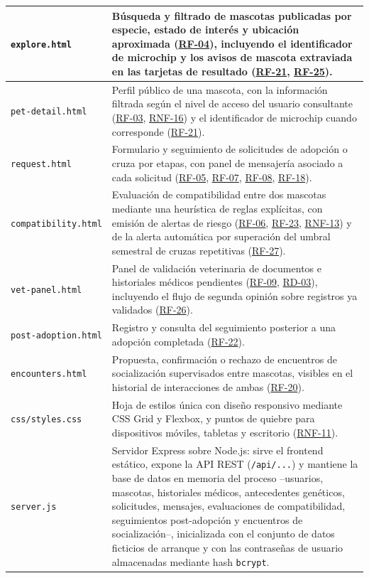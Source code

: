 \documentclass[journal,onecolumn]{IEEEtran}
\begin{document}
\begin{longtable}{@{}p{4.2cm} p{10.6cm}@{}}
		\hline
		\texttt{explore.html} & Búsqueda y filtrado de mascotas publicadas por especie, estado de interés y ubicación aproximada (\hyperref[tab:RF-04]{RF-04}), incluyendo el identificador de microchip y los avisos de mascota extraviada en las tarjetas de resultado (\hyperref[tab:RF-21]{RF-21}, \hyperref[tab:RF-25]{RF-25}). \\
		\hline
		\texttt{pet-detail.html} & Perfil público de una mascota, con la información filtrada según el nivel de acceso del usuario consultante (\hyperref[tab:RF-03]{RF-03}, \hyperref[tab:RNF-16]{RNF-16}) y el identificador de microchip cuando corresponde (\hyperref[tab:RF-21]{RF-21}). \\
		\hline
		\texttt{request.html} & Formulario y seguimiento de solicitudes de adopción o cruza por etapas, con panel de mensajería asociado a cada solicitud (\hyperref[tab:RF-05]{RF-05}, \hyperref[tab:RF-07]{RF-07}, \hyperref[tab:RF-08]{RF-08}, \hyperref[tab:RF-18]{RF-18}). \\
		\hline
		\texttt{compatibility.html} & Evaluación de compatibilidad entre dos mascotas mediante una heurística de reglas explícitas, con emisión de alertas de riesgo (\hyperref[tab:RF-06]{RF-06}, \hyperref[tab:RF-23]{RF-23}, \hyperref[tab:RNF-13]{RNF-13}) y de la alerta automática por superación del umbral semestral de cruzas repetitivas (\hyperref[tab:RF-27]{RF-27}). \\
		\hline
		\texttt{vet-panel.html} & Panel de validación veterinaria de documentos e historiales médicos pendientes (\hyperref[tab:RF-09]{RF-09}, \hyperref[tab:RD-03]{RD-03}), incluyendo el flujo de segunda opinión sobre registros ya validados (\hyperref[tab:RF-26]{RF-26}). \\
		\hline
		\texttt{post-adoption.html} & Registro y consulta del seguimiento posterior a una adopción completada (\hyperref[tab:RF-22]{RF-22}). \\
		\hline
		\texttt{encounters.html} & Propuesta, confirmación o rechazo de encuentros de socialización supervisados entre mascotas, visibles en el historial de interacciones de ambas (\hyperref[tab:RF-20]{RF-20}). \\
		\hline
		\texttt{css/styles.css} & Hoja de estilos única con diseño responsivo mediante CSS Grid y Flexbox, y puntos de quiebre para dispositivos móviles, tabletas y escritorio (\hyperref[tab:RNF-11]{RNF-11}). \\
		\hline
		\texttt{server.js} & Servidor Express sobre Node.js: sirve el frontend estático, expone la API REST (\texttt{/api/...}) y mantiene la base de datos en memoria del proceso --usuarios, mascotas, historiales médicos, antecedentes genéticos, solicitudes, mensajes, evaluaciones de compatibilidad, seguimientos post-adopción y encuentros de socialización--, inicializada con el conjunto de datos ficticios de arranque y con las contraseñas de usuario almacenadas mediante hash \texttt{bcrypt}. \\

\end{longtable}
\end{document}
